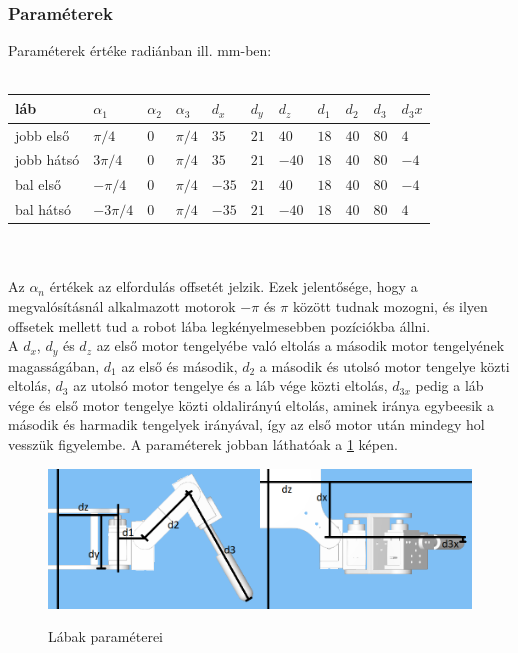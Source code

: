 \documentclass{article}
\begin{document}
\subsubsection{Paraméterek}
Paraméterek értéke radiánban ill. mm-ben:\\\\
\begin{tabular}{ | l | l | l | l | l | l | l | l | l | l | l | }
	\hline
	láb&$\alpha_1$&$\alpha_2$&$\alpha_3$&$d_x$&$d_y$&$d_z$&$d_1$&$d_2$&$d_3$&$d_3x$\\
	\hline
	jobb első&$\pi/4$&$0$&$\pi/4$&$35$&$21$&$40$&$18$&$40$&$80$&$4$\\
	\hline
	jobb hátsó&$3\pi/4$&$0$&$\pi/4$&$35$&$21$&$-40$&$18$&$40$&$80$&$-4$\\
	\hline
	bal első&$-\pi/4$&$0$&$\pi/4$&$-35$&$21$&$40$&$18$&$40$&$80$&$-4$\\
	\hline
	bal hátsó&$-3\pi/4$&$0$&$\pi/4$&$-35$&$21$&$-40$&$18$&$40$&$80$&$4$\\
	\hline
\end{tabular}\\\\
Az $\alpha_n$ értékek az elfordulás offsetét jelzik. Ezek jelentősége, hogy a megvalósításnál alkalmazott motorok $-\pi$ és $\pi$ között tudnak mozogni, és ilyen offsetek mellett tud a robot lába legkényelmesebben pozíciókba állni.\\
A $d_x$, $d_y$ és $d_z$ az első motor tengelyébe való eltolás a második motor tengelyének magasságában,	$d_1$ az első és második, $d_2$ a második és utolsó motor tengelye közti eltolás, $d_3$ az utolsó motor tengelye és a láb vége közti eltolás, $d_{3x}$ pedig a láb vége és első motor tengelye közti oldalirányú eltolás, aminek iránya egybeesik a második és harmadik tengelyek irányával, így az első motor után mindegy hol vesszük figyelembe. A paraméterek jobban láthatóak a \ref{fig:param} képen.
\begin{figure}
\begin{minipage}{0.9\textwidth}
	\caption{Lábak paraméterei}
	\includegraphics[width=\textwidth]{quad_params}
	\label{fig:param}
\end{minipage}
\end{figure}
\end{document}
